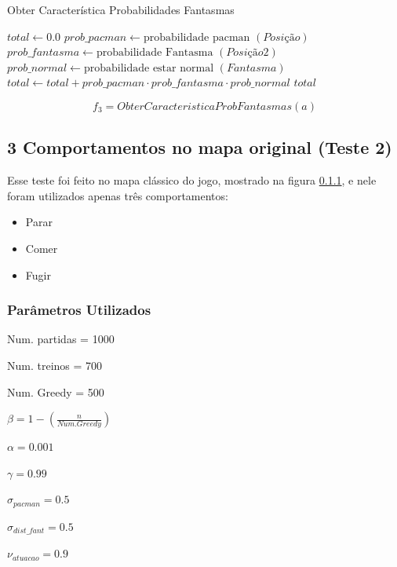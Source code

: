 \begin{algorithm}[H]
	\caption{Obter Característica Probabilidades Fantasmas} \label{algorithm:ObterCaracteristicaProbabilidadesFantasmas}
	\begin{algorithmic}[1]
			\State $\textit{total} \gets 0.0 $
						\State $\textit{prob\_pacman} \gets \text{probabilidade pacman } \left( \textit{Posição} \right) $
							\State $\textit{prob\_fantasma} \gets \text{probabilidade Fantasma } \left( \textit{Posição2} \right) $
							\State $\textit{prob\_normal} \gets \text{probabilidade estar normal } \left( \textit{Fantasma} \right) $
							\State $\textit{total} \gets \textit{total} + \textit{prob\_pacman}  \cdot \textit{prob\_fantasma} \cdot \textit{prob\_normal} $
						\EndFor
					\EndIf
				\EndFor
			\EndFor
			\State \Return $ \textit{total} $
		\EndProcedure
	\end{algorithmic}
\end{algorithm}

$$ f_3 = ObterCaracteristicaProbFantasmas \left( a \right) $$


\subsection{3 Comportamentos no mapa original (Teste 2)} \label{subsection:3ComportamentosMapaOriginal}

Esse teste foi feito no mapa clássico do jogo, mostrado na figura \ref{}, e nele foram utilizados apenas três comportamentos:

\begin{itemize}
	\item Parar
	\item Comer
	\item Fugir
\end{itemize}

\subsubsection{Parâmetros Utilizados}

\begin{multicols}{2}

Num. partidas = 1000

Num. treinos = 700

Num. Greedy = 500

$ \beta = 1 - \left( \frac{n}{Num. Greedy} \right) $

$ \alpha = 0.001 $

$ \gamma = 0.99 $

$ \sigma_{pacman} = 0.5 $

$ \sigma_{dist\_fant} = 0.5 $

$ \nu_{atuacao} = 0.9 $

\end{multicols}

